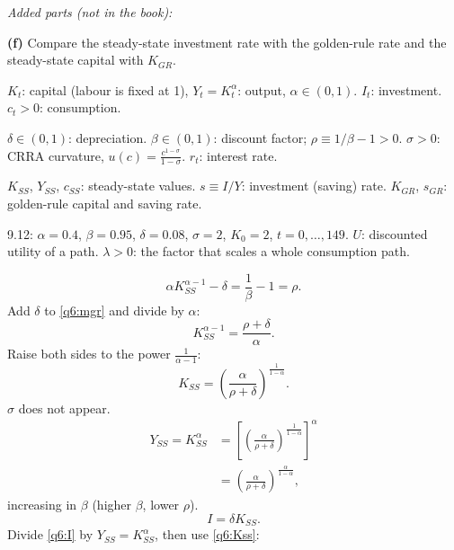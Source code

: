 \noindent\textit{Added parts (not in the book):}\par\nopagebreak
\textbf{(f)} Compare the steady-state investment rate with the golden-rule rate and the steady-state capital with $K_{GR}$.
\resolespaco
\begin{sol}
\begin{notacao}
\item $K_t$: capital (labour is fixed at 1), $Y_t=K_t^\alpha$: output, $\alpha\in(0,1)$. $I_t$: investment. $c_t>0$: consumption.
\item $\delta\in(0,1)$: depreciation. $\beta\in(0,1)$: discount factor; $\rho\equiv1/\beta-1>0$. $\sigma>0$: CRRA curvature,
$u(c)=\frac{c^{1-\sigma}}{1-\sigma}$. $r_t$: interest rate.
\item $K_{SS}$, $Y_{SS}$, $c_{SS}$: steady-state values. $s\equiv I/Y$: investment (saving) rate. $K_{GR}$, $s_{GR}$: golden-rule
capital and saving rate.
\item 9.12: $\alpha=0.4$, $\beta=0.95$, $\delta=0.08$, $\sigma=2$, $K_0=2$, $t=0,\dots,149$. $U$: discounted utility of a path.
$\lambda>0$: the factor that scales a whole consumption path.
\end{notacao}
\begin{equation}
\alpha K_{SS}^{\alpha-1}-\delta=\frac1\beta-1=\rho. \label{q6:mgr}
\end{equation}
Add $\delta$ to \eqref{q6:mgr} and divide by $\alpha$:
\[
K_{SS}^{\alpha-1}=\frac{\rho+\delta}\alpha .
\]
Raise both sides to the power $\frac{1}{\alpha-1}$:
\begin{equation}
K_{SS}=\left(\frac{\alpha}{\rho+\delta}\right)^{\frac1{1-\alpha}}. \label{q6:Kss}
\end{equation}
$\sigma$ does not appear.
\begin{align}
Y_{SS}=K_{SS}^\alpha &= \left[\left(\frac{\alpha}{\rho+\delta}\right)^{\frac1{1-\alpha}}\right]^{\alpha}\nonumber\\
&= \left(\frac{\alpha}{\rho+\delta}\right)^{\frac{\alpha}{1-\alpha}}, \label{q6:Yss}
\end{align}
increasing in $\beta$ (higher $\beta$, lower $\rho$).
\begin{equation}
I=\delta K_{SS}. \label{q6:I}
\end{equation}
Divide \eqref{q6:I} by $Y_{SS}=K_{SS}^\alpha$, then use \eqref{q6:Kss}:

\end{sol}
